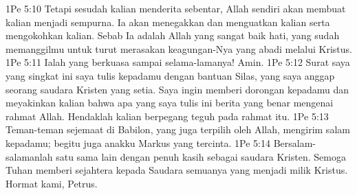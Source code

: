 1Pe 5:10  Tetapi sesudah kalian menderita sebentar, Allah sendiri akan membuat kalian menjadi sempurna. Ia akan menegakkan dan menguatkan kalian serta mengokohkan kalian. Sebab Ia adalah Allah yang sangat baik hati, yang sudah memanggilmu untuk turut merasakan keagungan-Nya yang abadi melalui Kristus.
1Pe 5:11  Ialah yang berkuasa sampai selama-lamanya! Amin.
1Pe 5:12  Surat saya yang singkat ini saya tulis kepadamu dengan bantuan Silas, yang saya anggap seorang saudara Kristen yang setia. Saya ingin memberi dorongan kepadamu dan meyakinkan kalian bahwa apa yang saya tulis ini berita yang benar mengenai rahmat Allah. Hendaklah kalian berpegang teguh pada rahmat itu.
1Pe 5:13  Teman-teman sejemaat di Babilon, yang juga terpilih oleh Allah, mengirim salam kepadamu; begitu juga anakku Markus yang tercinta.
1Pe 5:14  Bersalam-salamanlah satu sama lain dengan penuh kasih sebagai saudara Kristen. Semoga Tuhan memberi sejahtera kepada Saudara semuanya yang menjadi milik Kristus. Hormat kami, Petrus.


